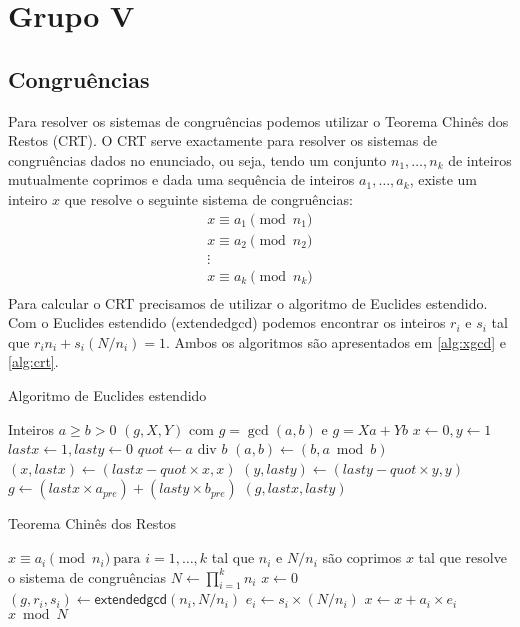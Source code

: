 \chapter{Grupo V}
\section{Congruências}
Para resolver os sistemas de congruências podemos utilizar o Teorema Chinês dos Restos (CRT). O CRT serve exactamente para resolver os sistemas de congruências dados no enunciado, ou seja, tendo um conjunto $n_1, \dotsc, n_k$ de inteiros mutualmente coprimos e dada uma sequência de inteiros $a_1, \dotsc, a_k$, existe um inteiro $x$ que resolve o seguinte sistema de congruências:
\begin{equation*}
\begin{matrix}
x \equiv a_1 \pmod{n_1} \\
x \equiv a_2 \pmod{n_2} \\
\vdots                  \\
x \equiv a_k \pmod{n_k} \\
\end{matrix}
\end{equation*}
Para calcular o CRT precisamos de utilizar o algoritmo de Euclides estendido. Com o Euclides estendido (\textsf{extendedgcd}) podemos encontrar os inteiros $r_i$ e $s_i$ tal que $r_i n_i + s_i (N/n_i) = 1$. Ambos os algoritmos são apresentados em \ref{alg:xgcd} e \ref{alg:crt}.\\
\begin{algorithm}
  \caption{Algoritmo de Euclides estendido}\label{alg:xgcd}
  \begin{algorithmic}
    \Require Inteiros $a \geq b > 0$
    \Ensure $(g, X, Y)$ com $g = \gcd{(a,b)}$ e $g = Xa + Yb$
    \State $x \gets 0, y \gets 1$
    \State $lastx \gets 1, lasty \gets 0$
      \State $quot \gets a \text{ div } b$
      \State $(a,b) \gets (b, a \bmod b)$
      \State $(x, lastx) \gets (lastx - quot \times x, x)$
      \State $(y, lasty) \gets (lasty - quot \times y, y)$
    \EndWhile
    \State $g \gets (lastx \times a_{pre}) + (lasty \times b_{pre})$
    \State \Return $(g, lastx, lasty)$
  \end{algorithmic}
\end{algorithm}
%
\begin{algorithm}
  \caption{Teorema Chinês dos Restos}\label{alg:crt}
  \begin{algorithmic}
    \Require $x \equiv a_i \pmod{n_i}\ \text{para } i = 1, \dotsc, k$ tal que $n_i$ e $N/n_i$ são coprimos
    \Ensure $x$ tal que resolve o sistema de congruências
    \State $N \gets \prod_{i = 1}^k{n_i}$
    \State $x \gets 0$
      \State $(g, r_i, s_i) \gets \mathsf{extendedgcd}(n_i, N/n_i)$
      \State $e_i \gets s_i \times (N/n_i)$
      \State $x \gets x + a_i \times e_i$
    \EndFor
    \State \Return $x \bmod{N}$
  \end{algorithmic}
\end{algorithm}

